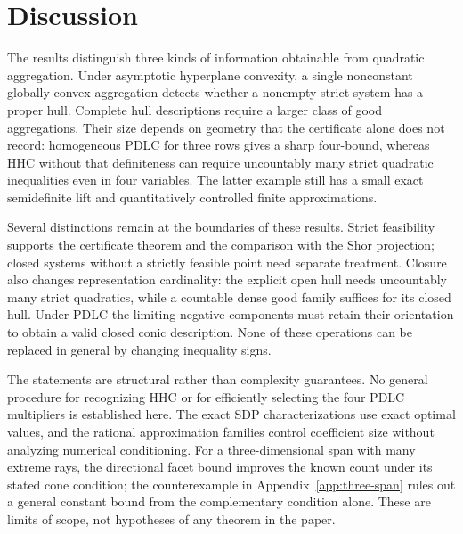 \section{Discussion}
\label{sec:discussion}

The results distinguish three kinds of information obtainable from
quadratic aggregation. Under asymptotic hyperplane convexity, a single
nonconstant globally convex aggregation detects whether a nonempty
strict system has a proper hull. Complete hull descriptions require a
larger class of good aggregations. Their size depends on geometry that
the certificate alone does not record: homogeneous PDLC for three rows
gives a sharp four-bound, whereas HHC without that definiteness can require
uncountably many strict quadratic inequalities even in four variables.
The latter example still has a small exact semidefinite lift and
quantitatively controlled finite approximations.

Several distinctions remain at the boundaries of these results.
Strict feasibility supports the certificate theorem and the comparison
with the Shor projection; closed systems without a strictly feasible
point need separate treatment. Closure also changes representation
cardinality: the explicit open hull needs uncountably many strict
quadratics, while a countable dense good family suffices for its closed
hull. Under PDLC the limiting negative components must retain their
orientation to obtain a valid closed conic description. None of these
operations can be replaced in general by changing inequality signs.

The statements are structural rather than complexity guarantees.
No general procedure for recognizing HHC or for efficiently selecting the
four PDLC multipliers is established here. The exact SDP characterizations
use exact optimal values, and the rational approximation families control
coefficient size without analyzing numerical conditioning. For a
three-dimensional span with many extreme rays, the directional facet
bound improves the known count under its stated cone condition; the
counterexample in Appendix~\ref{app:three-span} rules out a general
constant bound from the complementary condition alone. These are limits
of scope, not hypotheses of any theorem in the paper.
